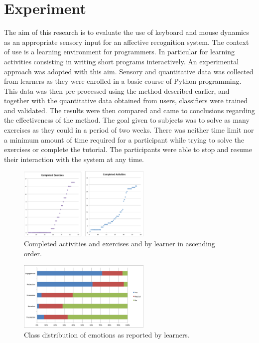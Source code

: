 \documentclass[conference]{IEEEtran}
\begin{document}
\section{Experiment}
\label{sec:exp}
The aim of this research is to evaluate the use of keyboard
and mouse dynamics as an appropriate sensory input for an affective recognition
system. The context of use is a learning environment for programmers. In
particular for learning activities consisting in writing short programs
interactively. An experimental approach was adopted with this aim. Sensory and
quantitative data was collected from learners as they were enrolled in a basic
course of Python programming. This data was then pre-processed using the method
described earlier, and together with the quantitative data obtained from users,
classifiers were trained and validated. The results were then compared and came
to conclusions regarding the effectiveness of the method. The goal given to
subjects was to solve as many exercises as they could in a period of two weeks.
There was neither time limit nor a minimum amount of time required for a
participant while trying to solve the exercises or complete the tutorial. The
participants were able to stop and resume their interaction with the system at
any time.




\begin{figure}[!t] 
\centering 
\includegraphics[width=2.5in]{Completed.png} 
\caption{Completed activities and exercises and by learner in ascending order.}
\label{fig_completed} 
\end{figure}

\begin{figure}[!t] 
\centering 
\includegraphics[width=2.5in]{classDist.png} 
\caption{Class distribution of emotions as reported by learners.}
\label{fig_class} 
\end{figure}
\end{document}
